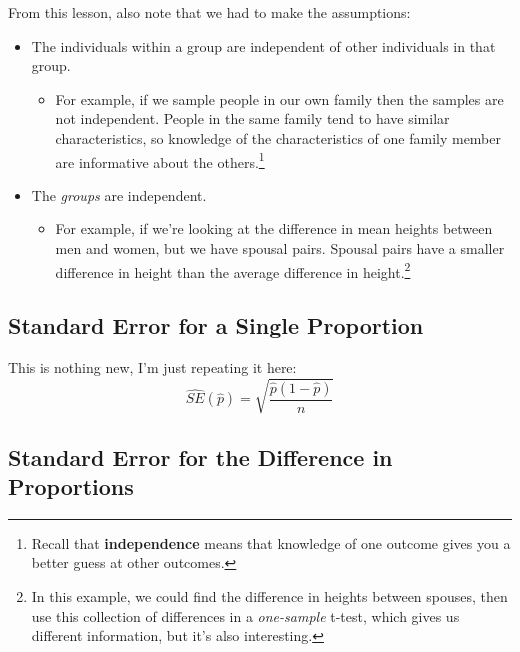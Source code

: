 \documentclass[
  letterpaper,
  DIV=11,
  numbers=noendperiod,
  oneside]{scrreprt}
\providecommand{\tightlist}{%
  \setlength{\itemsep}{0pt}\setlength{\parskip}{0pt}}\usepackage{longtable,booktabs,array}
\begin{document}
From this lesson, also note that we had to make the assumptions:

\begin{itemize}
\tightlist
\item
  The individuals within a group are independent of other individuals in
  that group.

  \begin{itemize}
  \tightlist
  \item
    For example, if we sample people in our own family then the samples
    are not independent. People in the same family tend to have similar
    characteristics, so knowledge of the characteristics of one family
    member are informative about the others.\footnote{Recall that
      \textbf{independence} means that knowledge of one outcome gives
      you a better guess at other outcomes.}
  \end{itemize}
\item
  The \emph{groups} are independent.

  \begin{itemize}
  \tightlist
  \item
    For example, if we're looking at the difference in mean heights
    between men and women, but we have spousal pairs. Spousal pairs have
    a smaller difference in height than the average difference in
    height.\footnote{In this example, we could find the difference in
      heights between spouses, then use this collection of differences
      in a \emph{one-sample} t-test, which gives us different
      information, but it's also interesting.}
  \end{itemize}
\end{itemize}

\hypertarget{standard-error-for-a-single-proportion}{%
\subsection{Standard Error for a Single
Proportion}\label{standard-error-for-a-single-proportion}}

This is nothing new, I'm just repeating it here: \[
\hat{SE}(\hat p) = \sqrt{\frac{\hat p(1 - \hat p)}{n}}
\]

\hypertarget{standard-error-for-the-difference-in-proportions}{%
\subsection{Standard Error for the Difference in
Proportions}\label{standard-error-for-the-difference-in-proportions}}
\end{document}
